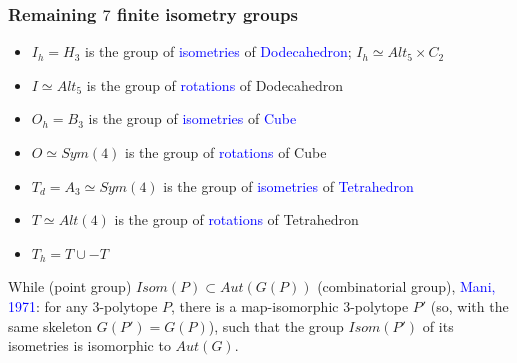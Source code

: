 \documentclass{beamer}
\begin{document}
\begin{frame}\frametitle{Remaining $7$ finite isometry groups}
\vspace{-1mm}
\begin{itemize} 
\item $I_h=H_3$ is the group of
\textcolor{blue}{isometries} of \textcolor{blue}{Dodecahedron};
$I_h\simeq Alt_5\times C_2$ 
\item $I\simeq Alt_5$ is the group of \textcolor{blue}{rotations} of Dodecahedron
\item $O_h=B_3$ is the group of \textcolor{blue}{isometries} of 
\textcolor{blue}{Cube}
\item $O\simeq Sym(4)$ is the group of \textcolor{blue}{rotations} of Cube
\item $T_d=A_3\simeq Sym(4)$ is the group of \textcolor{blue}{isometries}
of  \textcolor{blue}{Tetrahedron}
\item $T\simeq Alt(4)$ is the group of \textcolor{blue}{rotations} of Tetrahedron
\item $T_h=T\cup -T$
\end{itemize}
\vspace{1.5mm}

While 
(point group) $Isom(P)\subset Aut(G(P))$ (combinatorial group),
\textcolor{blue}{Mani, 1971}:
for any  $3$-polytope $P$, there is a map-isomorphic $3$-polytope $P'$ 
(so, with the same 
skeleton $G(P')=G(P)$), such that the    
group $Isom(P')$ of its isometries  is isomorphic to $Aut(G)$.
\end{frame}
\end{document}
